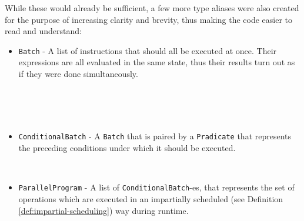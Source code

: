 While these would already be sufficient, a few more type aliases were also created for the purpose of increasing clarity and brevity, thus making the code easier to read and understand:
\begin{itemize}
    
    \item \verb|Batch| - A list of instructions that should all be executed at once. Their expressions are all evaluated in the same state, thus their results turn out as if they were done simultaneously.
    \begin{code}
        \>[2]\AgdaSpace{}%
        \AgdaSymbol{:}\AgdaSpace{}%
        \<%
        \\
        \>[2]\AgdaSpace{}%
        \AgdaSymbol{=}\AgdaSpace{}%
        \AgdaSpace{}%
        \<%
        \\
        \>[2]\AgdaSpace{}%
        \AgdaSymbol{:}\AgdaSpace{}%
        \AgdaSpace{}%
        \AgdaSpace{}%
        \AgdaSpace{}%
        \AgdaSpace{}%
        \<%
        \\
        \>[2]\AgdaSpace{}%
        \AgdaSymbol{=}\AgdaSpace{}%
        \<%
    \end{code}
    
    \item \verb|ConditionalBatch| - A \verb|Batch| that is paired by a \verb|Pradicate| that represents the preceding conditions under which it should be executed.
    \begin{code}
        \>[2]\AgdaSpace{}%
        \AgdaSymbol{:}\AgdaSpace{}%
        \<%
        \\
        \>[2]\AgdaSpace{}%
        \AgdaSymbol{=}\AgdaSpace{}%
        \AgdaSymbol{(}\AgdaSpace{}%
        \AgdaSpace{}%
        \AgdaSymbol{)}\<%
    \end{code}
    
    \item \verb|ParallelProgram| - A list of \verb|ConditionalBatch|-es, that represents the set of operations which are executed in an impartially scheduled (see Definition \ref{def:impartial-scheduling}) way during runtime.
    \begin{code}
        \>[2]\AgdaSpace{}%
        \AgdaSymbol{:}\AgdaSpace{}%
        \<%
        \\
        \>[2]\AgdaSpace{}%
        \AgdaSymbol{=}\AgdaSpace{}%
        \AgdaSpace{}%
        \<%
    \end{code}
    

\end{itemize}
